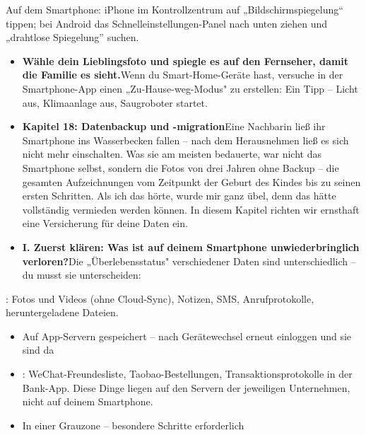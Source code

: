 
Auf dem Smartphone: iPhone im Kontrollzentrum auf „Bildschirmspiegelung“ tippen; bei Android das Schnelleinstellungen-Panel nach unten ziehen und „drahtlose Spiegelung” suchen.

\begin{itemize}
  \item \textbf{Wähle dein Lieblingsfoto und spiegle es auf den Fernseher, damit die Familie es sieht.}Wenn du Smart-Home-Geräte hast, versuche in der Smartphone-App einen „Zu-Hause-weg-Modus" zu erstellen: Ein Tipp – Licht aus, Klimaanlage aus, Saugroboter startet.
  \item \textbf{Kapitel 18: Datenbackup und -migration}Eine Nachbarin ließ ihr Smartphone ins Wasserbecken fallen – nach dem Herausnehmen ließ es sich nicht mehr einschalten. Was sie am meisten bedauerte, war nicht das Smartphone selbst, sondern die Fotos von drei Jahren ohne Backup – die gesamten Aufzeichnungen vom Zeitpunkt der Geburt des Kindes bis zu seinen ersten Schritten. Als ich das hörte, wurde mir ganz übel, denn das hätte vollständig vermieden werden können. In diesem Kapitel richten wir ernsthaft eine Versicherung für deine Daten ein.
  \item \textbf{I. Zuerst klären: Was ist auf deinem Smartphone unwiederbringlich verloren?}Die „Überlebensstatus" verschiedener Daten sind unterschiedlich – du musst sie unterscheiden:
\end{itemize}


: Fotos und Videos (ohne Cloud-Sync), Notizen, SMS, Anrufprotokolle, heruntergeladene Dateien.

\begin{itemize}
  \item Auf App-Servern gespeichert – nach Gerätewechsel erneut einloggen und sie sind da
  \item : WeChat-Freundesliste, Taobao-Bestellungen, Transaktionsprotokolle in der Bank-App. Diese Dinge liegen auf den Servern der jeweiligen Unternehmen, nicht auf deinem Smartphone.
  \item In einer Grauzone – besondere Schritte erforderlich
\end{itemize}

